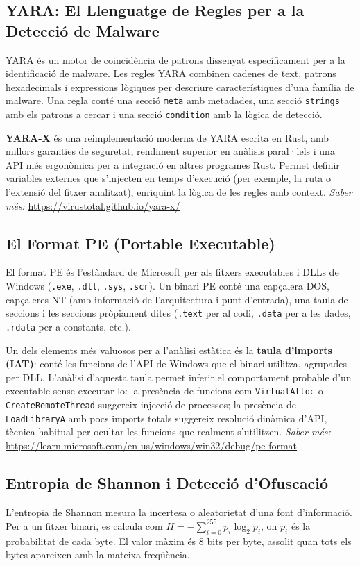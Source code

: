 \documentclass[12pt,a4paper]{report}
\begin{document}
\subsection{YARA: El Llenguatge de Regles per a la Detecció de Malware}
YARA és un motor de coincidència de patrons dissenyat específicament per a la identificació de malware. Les regles YARA combinen cadenes de text, patrons hexadecimals i expressions lògiques per descriure característiques d'una família de malware. Una regla conté una secció \texttt{meta} amb metadades, una secció \texttt{strings} amb els patrons a cercar i una secció \texttt{condition} amb la lògica de detecció.

\textbf{YARA-X} és una reimplementació moderna de YARA escrita en Rust, amb millors garanties de seguretat, rendiment superior en anàlisis paral·lels i una API més ergonòmica per a integració en altres programes Rust. Permet definir variables externes que s'injecten en temps d'execució (per exemple, la ruta o l'extensió del fitxer analitzat), enriquint la lògica de les regles amb context.
\textit{Saber més:} \url{https://virustotal.github.io/yara-x/}

\subsection{El Format PE (Portable Executable)}
El format PE és l'estàndard de Microsoft per als fitxers executables i DLLs de Windows (\texttt{.exe}, \texttt{.dll}, \texttt{.sys}, \texttt{.scr}). Un binari PE conté una capçalera DOS, capçaleres NT (amb informació de l'arquitectura i punt d'entrada), una taula de seccions i les seccions pròpiament dites (\texttt{.text} per al codi, \texttt{.data} per a les dades, \texttt{.rdata} per a constants, etc.).

Un dels elements més valuosos per a l'anàlisi estàtica és la \textbf{taula d'imports (IAT)}: conté les funcions de l'API de Windows que el binari utilitza, agrupades per DLL. L'anàlisi d'aquesta taula permet inferir el comportament probable d'un executable sense executar-lo: la presència de funcions com \texttt{VirtualAlloc} o \texttt{CreateRemoteThread} suggereix injecció de processos; la presència de \texttt{LoadLibraryA} amb pocs imports totals suggereix resolució dinàmica d'API, tècnica habitual per ocultar les funcions que realment s'utilitzen.
\textit{Saber més:} \url{https://learn.microsoft.com/en-us/windows/win32/debug/pe-format}

\subsection{Entropia de Shannon i Detecció d'Ofuscació}
L'entropia de Shannon mesura la incertesa o aleatorietat d'una font d'informació. Per a un fitxer binari, es calcula com $H = -\sum_{i=0}^{255} p_i \log_2 p_i$, on $p_i$ és la probabilitat de cada byte. El valor màxim és 8 bits per byte, assolit quan tots els bytes apareixen amb la mateixa freqüència.
\end{document}
